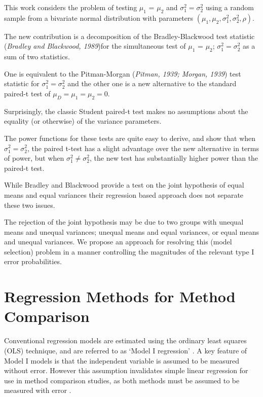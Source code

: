 \documentclass[12pt, a4paper]{report}
\theoremstyle{plain}
\theoremstyle{definition}
\theoremstyle{remark}
\begin{document}
	This work considers the problem of testing $\mu_1$ = $\mu_2$ and $\sigma^2_1 = \sigma^2_2$ using a random sample from a bivariate normal distribution with parameters $(\mu_1, \mu_2, \sigma^2_1, \sigma^2_2, \rho)$. 
	
	The new contribution is a decomposition of the Bradley-Blackwood test statistic (\textit{Bradley and Blackwood, 1989})for the simultaneous test of {$\mu_1$ = $\mu_2$; $\sigma^2_1 = \sigma^2_2$}  as a sum of two statistics. 
	
	One is equivalent to the Pitman-Morgan (\textit{Pitman, 1939; Morgan, 1939}) test statistic 
	for $\sigma^2_1 = \sigma^2_2$ and the other one is a new alternative to the standard paired-t test of $\mu_D = \mu_1 = \mu_2 = 0$. 
	
	Surprisingly, the classic Student paired-t test makes no assumptions about the equality (or otherwise) of the 
	variance parameters. 
	
	The power functions for these tests are quite easy to derive, and show that when $\sigma^2_1 = \sigma^2_2$, 
	the paired t-test has a slight advantage over the new alternative in terms of power, but when $\sigma^2_1 \neq \sigma^2_2$, the 
	new test has substantially higher power than the paired-t test.
	
	While Bradley and Blackwood provide a test on the joint hypothesis of equal means and equal variances their regression based approach does not separate these two issues.
	
	The rejection of the joint hypothesis may be 
	due to two groups with unequal means and unequal variances; unequal means and equal variances, or equal means and unequal variances. We propose an approach for resolving this (model selection) problem in a manner controlling the magnitudes of the relevant type I error probabilities.
	
	
	\section{Regression Methods for Method Comparison}
	Conventional regression models are estimated using the ordinary
	least squares (OLS) technique, and are referred to as `Model I
	regression' \citep{CornCoch,ludbrook97}. A key feature of Model I
	models is that the independent variable is assumed to be measured
	without error. However this assumption invalidates simple linear
	regression for use in method comparison studies, as both methods
	must be assumed to be measured with error \citep{BA83,ludbrook97}.
	
\end{document}
